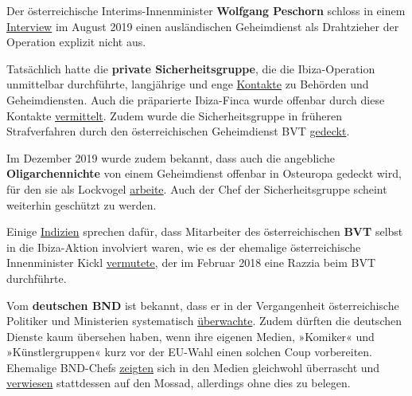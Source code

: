 Der österreichische Interims-Innenminister \textbf{Wolfgang Peschorn}
schloss in einem
\href{https://www.youtube.com/watch?v=Boyi80CyQYk}{Interview} im August
2019 einen ausländischen Geheimdienst als Drahtzieher der Operation
explizit nicht aus.

Tatsächlich hatte die \textbf{private Sicherheitsgruppe}, die die
Ibiza-Operation unmittelbar durchführte, langjährige und enge
\href{http://www.eu-infothek.com/ibiza-hintermaenner-ermittelten-fuer-lka-bk-und-finanzpolizei/}{Kontakte}
zu Behörden und Geheimdiensten. Auch die präparierte Ibiza-Finca wurde
offenbar durch diese Kontakte
\href{http://www.eu-infothek.com/ibiza-connection-die-unfassbare-einzigartige-ganze-geschichte/}{vermittelt}.
Zudem wurde die Sicherheitsgruppe in früheren Strafverfahren durch den
österreichischen Geheimdienst BVT
\href{http://www.eu-infothek.com/der-standard-geheimdienst-hatte-straches-fallensteller-schon-an-der-angel/}{gedeckt}.

Im Dezember 2019 wurde zudem bekannt, dass auch die angebliche
\textbf{Oligarchennichte} von einem Geheimdienst offenbar in Osteuropa
gedeckt wird, für den sie als Lockvogel
\href{https://web.archive.org/web/20191205134916/https://www.oe24.at/oesterreich/politik/Wer-schuetzt-den-Ibiza-Lockvogel/408323776}{arbeite}.
Auch der Chef der Sicherheitsgruppe scheint weiterhin geschützt zu
werden.

Einige
\href{https://www.oe24.at/oesterreich/politik/Verdacht-War-BVT-in-Ibiza-Video-involviert/389533553}{Indizien}
sprechen dafür, dass Mitarbeiter des österreichischen \textbf{BVT}
selbst in die Ibiza-Aktion involviert waren, wie es der ehemalige
österreichische Innenminister Kickl
\href{https://www.oe24.at/oesterreich/politik/Kickl-ueber-Ibiza-Video-Verbindung-zu-BVT/381763805}{vermutete},
der im Februar 2018 eine Razzia beim BVT durchführte.

Vom \textbf{deutschen BND} ist bekannt, dass er in der Vergangenheit
österreichische Politiker und Ministerien systematisch
\href{https://www.zeit.de/2018/26/bnd-spionage-oesterreich-daten}{überwachte}.
Zudem dürften die deutschen Dienste kaum übersehen haben, wenn ihre
eigenen Medien, »Komiker« und »Künstler­gruppen« kurz vor der EU-Wahl
einen solchen Coup vorbereiten. Ehemalige BND-Chefs
\href{https://www.n-tv.de/mediathek/videos/politik/Offenkundig-wird-hier-versucht-Wahlen-zu-manipulieren-article21035713.html}{zeigten}
sich in den Medien gleichwohl überrascht und
\href{https://archive.is/20190522200701/https://www.cicero.de/aussenpolitik/heinz-christian-strache-video-johannes-gudenus-ibiza-israel-mossad}{verwiesen}
stattdessen auf den Mossad, allerdings ohne dies zu belegen.

